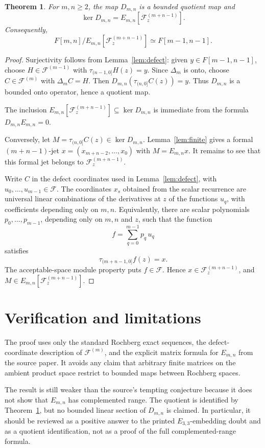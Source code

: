 \documentclass[11pt]{article}
\newtheorem{theorem}{Theorem}
\newcommand{\F}{\mathscr F}
\begin{document}
\begin{theorem}\label{thm:quotient}
For \(m,n\ge2\), the map \(D_{m,n}\) is a bounded quotient map and
\[
  \ker D_{m,n}=E_{m,n}[\F_z^{(m+n-1)}].
\]
Consequently,
\[
  F[m,n]\big/ E_{m,n}[\F_z^{(m+n-1)}]\simeq F[m-1,n-1].
\]
\end{theorem}

\begin{proof}
Surjectivity follows from Lemma~\ref{lem:defect}: given \(y\in F[m-1,n-1]\), choose \(H\in\F^{(m-1)}\) with \(\tau_{(n-1,0]}H(z)=y\).  Since \(\Delta_m\) is onto, choose \(C\in\F^{(m)}\) with \(\Delta_m C=H\).  Then \(D_{m,n}(\tau_{(n,0]}C(z))=y\).  Thus \(D_{m,n}\) is a bounded onto operator, hence a quotient map.

The inclusion \(E_{m,n}[\F_z^{(m+n-1)}]\subseteq\ker D_{m,n}\) is immediate from the formula \(D_{m,n}E_{m,n}=0\).

Conversely, let \(M=\tau_{(n,0]}C(z)\in\ker D_{m,n}\).  Lemma~\ref{lem:finite} gives a formal \((m+n-1)\)-jet \(x=(x_{m+n-2},\ldots,x_0)\) with \(M=E_{m,n}x\).  It remains to see that this formal jet belongs to \(\F_z^{(m+n-1)}\).

Write \(C\) in the defect coordinates used in Lemma~\ref{lem:defect}, with \(u_0,\ldots,u_{m-1}\in\F\).  The coordinates \(x_s\) obtained from the scalar recurrence are universal linear combinations of the derivatives at \(z\) of the functions \(u_q\), with coefficients depending only on \(m,n\).  Equivalently, there are scalar polynomials \(p_0,\ldots,p_{m-1}\), depending only on \(m,n\) and \(z\), such that the function
\[
  f=\sum_{q=0}^{m-1} p_q\,u_q
\]
satisfies
\[
  \tau_{(m+n-1,0]}f(z)=x.
\]
The acceptable-space module property puts \(f\in\F\).  Hence \(x\in\F_z^{(m+n-1)}\), and \(M\in E_{m,n}[\F_z^{(m+n-1)}]\).
\end{proof}

\section*{Verification and limitations}

The proof uses only the standard Rochberg exact sequences, the defect-coordinate description of \(\F^{(m)}\), and the explicit matrix formula for \(E_{m,n}\) from the source paper.  It avoids any claim that arbitrary finite matrices on the ambient product space restrict to bounded maps between Rochberg spaces.

The result is still weaker than the source's tempting conjecture because it does not show that \(E_{m,n}\) has complemented range.  The quotient is identified by Theorem~\ref{thm:quotient}, but no bounded linear section of \(D_{m,n}\) is claimed.  In particular, it should be reviewed as a positive answer to the printed \(E_{3,3}\)-embedding doubt and as a quotient identification, not as a proof of the full complemented-range formula.
\end{document}
